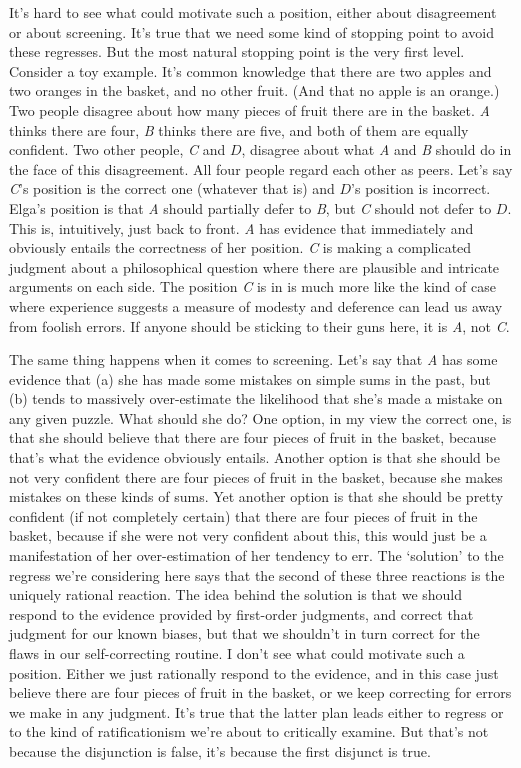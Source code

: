 \documentclass[
  11pt,
  letterpaper,
  DIV=11,
  numbers=noendperiod,
  twoside]{scrartcl}
\begin{document}
It's hard to see what could motivate such a position, either about
disagreement or about screening. It's true that we need some kind of
stopping point to avoid these regresses. But the most natural stopping
point is the very first level. Consider a toy example. It's common
knowledge that there are two apples and two oranges in the basket, and
no other fruit. (And that no apple is an orange.) Two people disagree
about how many pieces of fruit there are in the basket. \emph{A} thinks
there are four, \emph{B} thinks there are five, and both of them are
equally confident. Two other people, \emph{C} and \(D\), disagree about
what \emph{A} and \emph{B} should do in the face of this disagreement.
All four people regard each other as peers. Let's say \emph{C}'s
position is the correct one (whatever that is) and \(D\)'s position is
incorrect. Elga's position is that \emph{A} should partially defer to
\emph{B}, but \emph{C} should not defer to \(D\). This is, intuitively,
just back to front. \emph{A} has evidence that immediately and obviously
entails the correctness of her position. \emph{C} is making a
complicated judgment about a philosophical question where there are
plausible and intricate arguments on each side. The position \emph{C} is
in is much more like the kind of case where experience suggests a
measure of modesty and deference can lead us away from foolish errors.
If anyone should be sticking to their guns here, it is \emph{A}, not
\emph{C}.

The same thing happens when it comes to screening. Let's say that
\emph{A} has some evidence that (a) she has made some mistakes on simple
sums in the past, but (b) tends to massively over-estimate the
likelihood that she's made a mistake on any given puzzle. What should
she do? One option, in my view the correct one, is that she should
believe that there are four pieces of fruit in the basket, because
that's what the evidence obviously entails. Another option is that she
should be not very confident there are four pieces of fruit in the
basket, because she makes mistakes on these kinds of sums. Yet another
option is that she should be pretty confident (if not completely
certain) that there are four pieces of fruit in the basket, because if
she were not very confident about this, this would just be a
manifestation of her over-estimation of her tendency to err. The
`solution' to the regress we're considering here says that the second of
these three reactions is the uniquely rational reaction. The idea behind
the solution is that we should respond to the evidence provided by
first-order judgments, and correct that judgment for our known biases,
but that we shouldn't in turn correct for the flaws in our
self-correcting routine. I don't see what could motivate such a
position. Either we just rationally respond to the evidence, and in this
case just believe there are four pieces of fruit in the basket, or we
keep correcting for errors we make in any judgment. It's true that the
latter plan leads either to regress or to the kind of ratificationism
we're about to critically examine. But that's not because the
disjunction is false, it's because the first disjunct is true.
\end{document}
